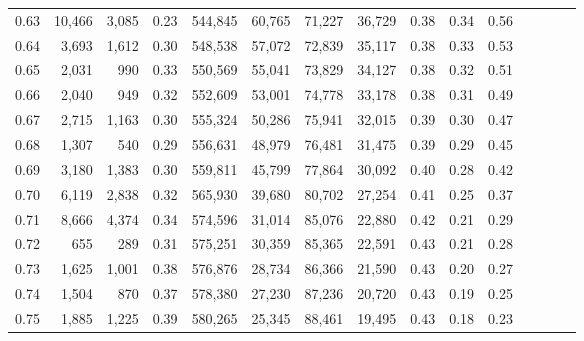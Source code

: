 \begin{tabular}{rrrcrrrrrrrrrrr}
0.63 &  10,466 &  3,085 &                                       0.23 &  544,845 &   60,765 &   71,227 &   36,729 &  0.38 &  0.34 &                         0.56 \\
0.64 &   3,693 &  1,612 &                                       0.30 &  548,538 &   57,072 &   72,839 &   35,117 &  0.38 &  0.33 &                         0.53 \\
0.65 &   2,031 &    990 &                                       0.33 &  550,569 &   55,041 &   73,829 &   34,127 &  0.38 &  0.32 &                         0.51 \\
0.66 &   2,040 &    949 &                                       0.32 &  552,609 &   53,001 &   74,778 &   33,178 &  0.38 &  0.31 &                         0.49 \\
0.67 &   2,715 &  1,163 &                                       0.30 &  555,324 &   50,286 &   75,941 &   32,015 &  0.39 &  0.30 &                         0.47 \\
0.68 &   1,307 &    540 &                                       0.29 &  556,631 &   48,979 &   76,481 &   31,475 &  0.39 &  0.29 &                         0.45 \\
0.69 &   3,180 &  1,383 &                                       0.30 &  559,811 &   45,799 &   77,864 &   30,092 &  0.40 &  0.28 &                         0.42 \\
0.70 &   6,119 &  2,838 &                                       0.32 &  565,930 &   39,680 &   80,702 &   27,254 &  0.41 &  0.25 &                         0.37 \\
0.71 &   8,666 &  4,374 &                                       0.34 &  574,596 &   31,014 &   85,076 &   22,880 &  0.42 &  0.21 &                         0.29 \\
0.72 &     655 &    289 &                                       0.31 &  575,251 &   30,359 &   85,365 &   22,591 &  0.43 &  0.21 &                         0.28 \\
0.73 &   1,625 &  1,001 &                                       0.38 &  576,876 &   28,734 &   86,366 &   21,590 &  0.43 &  0.20 &                         0.27 \\
0.74 &   1,504 &    870 &                                       0.37 &  578,380 &   27,230 &   87,236 &   20,720 &  0.43 &  0.19 &                         0.25 \\
0.75 &   1,885 &  1,225 &                                       0.39 &  580,265 &   25,345 &   88,461 &   19,495 &  0.43 &  0.18 &                         0.23 \\

\end{tabular}
